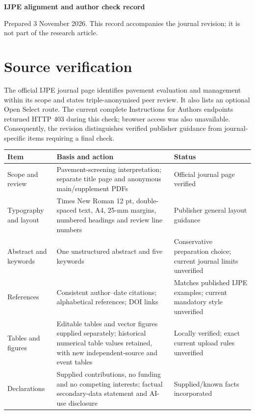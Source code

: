 \documentclass[11pt]{article}
\begin{document}
{\Large\bfseries IJPE alignment and author check record}\par
Prepared 3 November 2026. This record accompanies the journal revision; it is not part of the research article.

\section*{Source verification}
The official IJPE journal page identifies pavement evaluation and management within its scope and states triple-anonymised peer review. It also lists an optional Open Select route. The current complete Instructions for Authors endpoints returned HTTP 403 during this check; browser access was also unavailable. Consequently, the revision distinguishes verified publisher guidance from journal-specific items requiring a final check.

\begin{tabularx}{\linewidth}{@{}p{.26\linewidth}Xp{.23\linewidth}@{}}
\toprule Item & Basis and action & Status \\
\midrule
Scope and review & Pavement-screening interpretation; separate title page and anonymous main/supplement PDFs & Official journal page verified \\
Typography and layout & Times New Roman 12 pt, double-spaced text, A4, 25-mm margins, numbered headings and review line numbers & Publisher general layout guidance \\
Abstract and keywords & One unstructured abstract and five keywords & Conservative preparation choice; current journal limits unverified \\
References & Consistent author--date citations; alphabetical references; DOI links & Matches published IJPE examples; current mandatory style unverified \\
Tables and figures & Editable tables and vector figures supplied separately; historical numerical table values retained, with new independent-source and event tables & Locally verified; exact current upload rules unverified \\
Declarations & Supplied contributions, no funding and no competing interests; factual secondary-data statement and AI-use disclosure & Supplied/known facts incorporated \\
\bottomrule
\end{tabularx}
\end{document}
